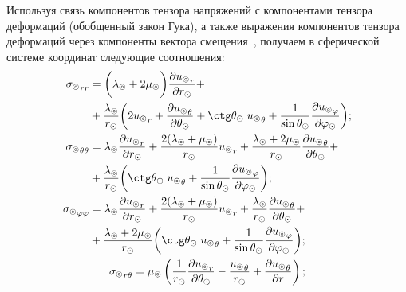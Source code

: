 Используя связь компонентов тензора напряжений с компонентами тензора деформаций (обобщенный закон Гука), а также выражения компонентов тензора деформаций через компоненты вектора смещения~\cite{Nowacki}, получаем в сферической системе координат следующие соотношения:
\begin{equation}\label{tensor comp}
    \begin{gathered}
    \begin{aligned}
        {\sigma_\circledcirc}_{rr} &= \biggl(\lambda_\circledcirc+2\mu_\circledcirc\biggr)\frac{\partial {u_\circledcirc}_r}{\partial r_\odot} +\\
        &+ \frac{\lambda_\circledcirc} {r_\odot} \biggl(2{u_\circledcirc}_r+\frac{\partial {u_\circledcirc}_\theta}{\partial\theta_\odot}+\ctg\theta_\odot\;{u_\circledcirc}_\theta + \frac{1}{\sin\theta_\odot}\frac{\partial {u_\circledcirc}_\varphi}{\partial\varphi_\odot}\biggr);\\        
        {\sigma_\circledcirc}_{\theta\theta} &= \lambda_\circledcirc\frac{\partial {u_\circledcirc}_r}{\partial r_\odot} + \frac{2(\lambda_\circledcirc+\mu_\circledcirc)}{r_\odot} {u_\circledcirc}_r + \frac{\lambda_\circledcirc+2\mu_\circledcirc}{r_\odot} \frac{\partial {u_\circledcirc}_\theta}{\partial\theta_\odot} +\\
         &+ \frac{\lambda_\circledcirc}{r_\odot} \biggl(\ctg\theta_\odot \;{u_\circledcirc}_\theta + \frac{1}{\sin\theta_\odot}\frac{\partial {u_\circledcirc}_\varphi}{\partial\varphi_\odot}\biggr);\\
        {\sigma_\circledcirc}_{\varphi\varphi} &= \lambda_\circledcirc\frac{\partial {u_\circledcirc}_r}{\partial r_\odot} + \frac{2(\lambda_\circledcirc+\mu_\circledcirc)}{r_\odot} {u_\circledcirc}_r + \frac{\lambda_\circledcirc}{r_\odot} \frac{\partial {u_\circledcirc}_\theta}{\partial\theta_\odot} +\\
        &+ \frac{\lambda_\circledcirc+2\mu_\circledcirc}{r_\odot}\biggl(\ctg\theta_\odot \;{u_\circledcirc}_\theta + \frac{1}{\sin\theta_\odot}\frac{\partial {u_\circledcirc}_\varphi}{\partial\varphi_\odot}\biggr);\\
    \end{aligned}\\
    \begin{aligned}
        {\sigma_\circledcirc}_{r\theta}=\mu_\circledcirc&\left(\frac1{r_\odot} \frac{\partial {u_\circledcirc}_r}{\partial\theta_\odot} - \frac{{u_\circledcirc}_\theta}{r_\odot} + \frac{\partial {u_\circledcirc}_\theta}{\partial r}\right);\\

\end{aligned}
\end{gathered}
\end{equation}
